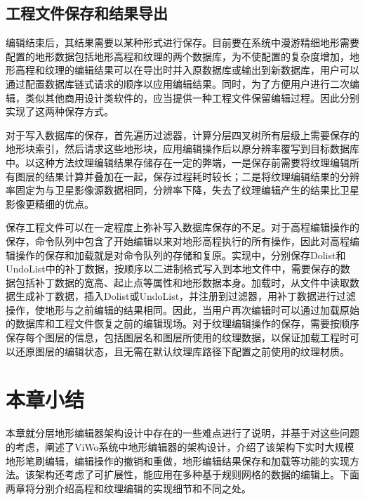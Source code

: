 \subsection{工程文件保存和结果导出}
编辑结束后，其结果需要以某种形式进行保存。目前要在系统中漫游精细地形需要配置的地形数据包括地形高程和纹理的两个数据库，为不使配置的复杂度增加，地形高程和纹理的编辑结果可以在导出时并入原数据库或输出到新数据库，用户可以通过配置数据库链式请求的顺序以应用编辑结果。同时，为了方便用户进行二次编辑，类似其他商用设计类软件的，应当提供一种工程文件保留编辑过程。因此分别实现了这两种保存方式。\par
对于写入数据库的保存，首先遍历过滤器，计算分层四叉树所有层级上需要保存的地形块索引，然后请求这些地形块，应用编辑操作后以原分辨率覆写到目标数据库中。以这种方法纹理编辑结果存储存在一定的弊端，一是保存前需要将纹理编辑所有图层的结果计算并叠加在一起，保存过程耗时较长；二是将纹理编辑结果的分辨率固定为与卫星影像源数据相同，分辨率下降，失去了纹理编辑产生的结果比卫星影像更精细的优点。\par
保存工程文件可以在一定程度上弥补写入数据库保存的不足。对于高程编辑操作的保存，命令队列中包含了开始编辑以来对地形高程执行的所有操作，因此对高程编辑操作的保存和加载就是对命令队列的存储和复原。实现中，分别保存Dolist和UndoList中的补丁数据，按顺序以二进制格式写入到本地文件中，需要保存的数据包括补丁数据的宽高、起止点等属性和地形数据本身。加载时，从文件中读取数据生成补丁数据，插入Dolist或UndoList，并注册到过滤器，用补丁数据进行过滤操作，使地形与之前编辑的结果相同。因此，当用户再次编辑时可以通过加载原始的数据库和工程文件恢复之前的编辑现场。对于纹理编辑操作的保存，需要按顺序保存每个图层的信息，包括图层名和图层所使用的纹理数据，以保证加载工程时可以还原图层的编辑状态，且无需在默认纹理库路径下配置之前使用的纹理材质。\par


\section{本章小结}
本章就分层地形编辑器架构设计中存在的一些难点进行了说明，并基于对这些问题的考虑，阐述了ViWo系统中地形编辑器的架构设计，介绍了该架构下实时大规模地形笔刷编辑，编辑操作的撤销和重做，地形编辑结果保存和加载等功能的实现方法。该架构还考虑了可扩展性，能应用在多种基于规则网格的数据的编辑上。下面两章将分别介绍高程和纹理编辑的实现细节和不同之处。
